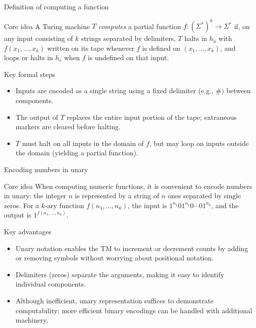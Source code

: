 \begin{frame}[t]{Definition of computing a function}
  \begin{tblock}{Core idea}
    A Turing machine $T$ \emph{computes} a partial function
    $f: (\Sigma^*)^k \rightarrow \Sigma^*$ if, on any input consisting of
    $k$ strings separated by delimiters, $T$ halts in $h_a$ with
    $f(x_1,\dots,x_k)$ written on its tape whenever $f$ is defined on
    $(x_1,\dots,x_k)$, and loops or halts in $h_r$ when $f$ is
    undefined on that input.
  \end{tblock}
  \begin{tblock}{Key formal steps}
    \begin{itemize}
      \item Inputs are encoded as a single string using a fixed
        delimiter (e.g., $\#)$ between components.
      \item The output of $T$ replaces the entire input portion of
        the tape; extraneous markers are cleared before halting.
      \item $T$ must halt on all inputs in the domain of $f$, but may
        loop on inputs outside the domain (yielding a partial function).
    \end{itemize}
  \end{tblock}
  \label{fr:7.3-02}
\end{frame}

\begin{frame}[t]{Encoding numbers in unary}
  \begin{tblock}{Core idea}
    When computing numeric functions, it is convenient to encode
    numbers in unary: the integer $n$ is represented by a string of
    $n$ ones separated by single zeros.  For a $k$‑ary function
    $f(n_1,\dots,n_k)$, the input is $1^{n_1} 0 1^{n_2} 0 \cdots 0
    1^{n_k}$, and the output is $1^{f(n_1,\dots,n_k)}$.
  \end{tblock}
  \begin{tblock}{Key advantages}
    \begin{itemize}
      \item Unary notation enables the TM to increment or decrement
        counts by adding or removing symbols without worrying about
        positional notation.
      \item Delimiters (zeros) separate the arguments, making it easy
        to identify individual components.
      \item Although inefficient, unary representation suffices to
        demonstrate computability; more efficient binary encodings can be
        handled with additional machinery.
    \end{itemize}
  \end{tblock}
  \label{fr:7.3-03}
\end{frame}

